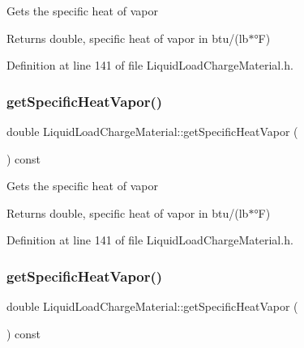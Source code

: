 Gets the specific heat of vapor \begin{DoxyReturn}{Returns}
double, specific heat of vapor in btu/(lb$\ast$°F) 
\end{DoxyReturn}


Definition at line 141 of file Liquid\+Load\+Charge\+Material.\+h.

\mbox{\label{class_liquid_load_charge_material_ac4538f9722bf25465ec86586469a7b1e}} 
\subsubsection{\texorpdfstring{get\+Specific\+Heat\+Vapor()}{getSpecificHeatVapor()}\hspace{0.1cm}{\footnotesize\ttfamily [2/3]}}
{\footnotesize\ttfamily double Liquid\+Load\+Charge\+Material\+::get\+Specific\+Heat\+Vapor (\begin{DoxyParamCaption}{ }\end{DoxyParamCaption}) const\hspace{0.3cm}{\ttfamily [inline]}}

Gets the specific heat of vapor \begin{DoxyReturn}{Returns}
double, specific heat of vapor in btu/(lb$\ast$°F) 
\end{DoxyReturn}


Definition at line 141 of file Liquid\+Load\+Charge\+Material.\+h.

\mbox{\label{class_liquid_load_charge_material_ac4538f9722bf25465ec86586469a7b1e}} 
\subsubsection{\texorpdfstring{get\+Specific\+Heat\+Vapor()}{getSpecificHeatVapor()}\hspace{0.1cm}{\footnotesize\ttfamily [3/3]}}
{\footnotesize\ttfamily double Liquid\+Load\+Charge\+Material\+::get\+Specific\+Heat\+Vapor (\begin{DoxyParamCaption}{ }\end{DoxyParamCaption}) const\hspace{0.3cm}{\ttfamily [inline]}}

